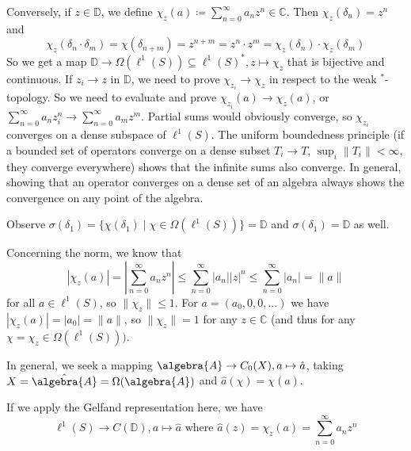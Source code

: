 \documentclass[a4paper]{article}
\begin{document}
\begin{exercise}
	Conversely, if $z \in \mathds{D}$, we define $\chi_z(a) \coloneq \sum_{n = 0}^{\infty} a_n z^n \in \mathds{C}$. Then $\chi_z(\delta_n) = z^n$ and
	\begin{equation*}
		\chi_z(\delta_n \cdot \delta_m) = \chi(\delta_{n + m}) = z^{n+m} = z^n \cdot z^m = \chi_z(\delta_n) \cdot \chi_z(\delta_m)
	\end{equation*}
	So we get a map $\mathds{D} \to \Omega(\ell^1(S)) \subseteq \ell^1(S)^*, z \mapsto \chi_z$ that is bijective and continuous.
	If $z_i \to z$ in $\mathds{D}$, we need to prove $\chi_{z_i} \to \chi_z$ in respect to the weak $^*$-topology.
	So we need to evaluate and prove $\chi_{z_i} (a) \to \chi_z(a)$, or $\sum_{n=0}^{\infty} a_n z_i^n \to \sum_{n = 0}^{\infty} a_m z^m$. Partial sums would obviously converge, so $\chi_{z_i}$ converges on a dense subspace of $\ell^1(S)$.
	The uniform boundedness principle (if a bounded set of operators converge on a dense subset $T_i \to T$, $\sup_i \| T_i \| < \infty$, they converge everywhere) shows that the infinite sums also converge.
	In general, showing that an operator converges on a dense set of an algebra always shows the convergence on any point of the algebra.

	Observe $\sigma(\delta_1) = \{\chi(\delta_1) \mid \chi \in \Omega(\ell^1(S)) \} = \mathds{D}$ and $\sigma(\delta_1) = \mathds{D}$ as well.

	Concerning the norm, we know that 
	\begin{equation*}
		|\chi_z(a)| = \left| \sum_{n = 0}^{\infty} a_n z^n \right| \leq \sum_{n=0}^{\infty} |a_n| |z|^n \leq \sum_{n=0}^{\infty} |a_n| = \|a\|
	\end{equation*}
	for all $a \in \ell^1(S)$, so $\|\chi_z\| \leq 1$.
	For $a = (a_0, 0, 0, \dots)$ we have $|\chi_z(a)| = |a_0| = \|a\|$, so $\|\chi_z\| = 1$ for any $z \in \mathds{C}$ (and thus for any $\chi = \chi_z \in \Omega(\ell^1(S)))$.
\end{exercise}

\begin{remark}
	In general, we seek a mapping $\algebra{A} \to C_0(X), a \mapsto \hat{a}$, taking $X = \hat{\algebra{A}} = \Omega(\algebra{A})$ and $\hat{a}(\chi) = \chi(a)$.
	
	If we apply the Gelfand representation here, we have
	\begin{equation*}
		\ell^1(S) \to C(\mathds{D}), a \mapsto \hat{a} \text{ where } \hat{a}(z) = \chi_z(a) = \sum_{n=0}^{\infty} a_n z^n
	\end{equation*}
\end{remark}
\end{document}
